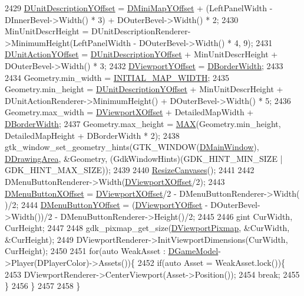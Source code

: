 \begin{DoxyCode}
2429     \hyperlink{classCApplicationData_a6c60b2da482699f1d998acfe24fec332}{DUnitDescriptionYOffset} = \hyperlink{classCApplicationData_ad33fc850bd8262a4bdf1f23e9477d5ad}{DMiniMapYOffset} + (LeftPanelWidth - 
      DInnerBevel->Width() * 3) + DOuterBevel->Width() * 2;
2430     MinUnitDescrHeight = DUnitDescriptionRenderer->MinimumHeight(LeftPanelWidth - DOuterBevel->Width() * 4,
       9);
2431     \hyperlink{classCApplicationData_a8ccfb55bd25cba0e6eb66573ba9c8b3c}{DUnitActionYOffset} = \hyperlink{classCApplicationData_a6c60b2da482699f1d998acfe24fec332}{DUnitDescriptionYOffset} + 
      MinUnitDescrHeight + DOuterBevel->Width() * 3;
2432     \hyperlink{classCApplicationData_afc58ed96a1af813b28f6abf2c7d2dc72}{DViewportYOffset} = \hyperlink{classCApplicationData_a566b69c72fa982c6ecf8e47dc21df489}{DBorderWidth};
2433     
2434     Geometry.min\_width = \hyperlink{main_8cpp_ad7891427e5564fd0ea2a08a5857e4239}{INITIAL\_MAP\_WIDTH};
2435     Geometry.min\_height = \hyperlink{classCApplicationData_a6c60b2da482699f1d998acfe24fec332}{DUnitDescriptionYOffset} + MinUnitDescrHeight + 
      DUnitActionRenderer->MinimumHeight() + DOuterBevel->Width() * 5;
2436     Geometry.max\_width = \hyperlink{classCApplicationData_a306bba873ccc47126111305fe21ef3ff}{DViewportXOffset} + DetailedMapWidth + 
      \hyperlink{classCApplicationData_a566b69c72fa982c6ecf8e47dc21df489}{DBorderWidth};
2437     Geometry.max\_height = \hyperlink{main_8cpp_afa99ec4acc4ecb2dc3c2d05da15d0e3f}{MAX}(Geometry.min\_height, DetailedMapHeight + DBorderWidth * 2);
2438     gtk\_window\_set\_geometry\_hints(GTK\_WINDOW(\hyperlink{classCApplicationData_af3c57a84b4ecca8a7f86b67a0ae55372}{DMainWindow}), 
      \hyperlink{classCApplicationData_a4735f5d31632313e0b2a1659eb178987}{DDrawingArea}, &Geometry, (GdkWindowHints)(GDK\_HINT\_MIN\_SIZE | GDK\_HINT\_MAX\_SIZE));
2439     
2440     \hyperlink{classCApplicationData_ad8b16ccb099b4996ce9fee34a407c091}{ResizeCanvases}();
2441     
2442     DMenuButtonRenderer->Width(\hyperlink{classCApplicationData_a306bba873ccc47126111305fe21ef3ff}{DViewportXOffset}/2);
2443     \hyperlink{classCApplicationData_a04283b17a8c04af8325de4304a848095}{DMenuButtonXOffset} = \hyperlink{classCApplicationData_a306bba873ccc47126111305fe21ef3ff}{DViewportXOffset}/2 - DMenuButtonRenderer->Width(
      )/2;
2444     \hyperlink{classCApplicationData_a63012360d0a98eef89707a503f4379a8}{DMenuButtonYOffset} = (\hyperlink{classCApplicationData_afc58ed96a1af813b28f6abf2c7d2dc72}{DViewportYOffset} - DOuterBevel->Width())/2 - 
      DMenuButtonRenderer->Height()/2;
2445     
2446     gint CurWidth, CurHeight;
2447         
2448     gdk\_pixmap\_get\_size(\hyperlink{classCApplicationData_ac8801e116d0c49776c9f3db7415287fe}{DViewportPixmap}, &CurWidth, &CurHeight); 
2449     DViewportRenderer->InitViewportDimensions(CurWidth, CurHeight); 
2450     
2451     \textcolor{keywordflow}{for}(\textcolor{keyword}{auto} WeakAsset : \hyperlink{classCApplicationData_a32b50c7c1cbac3cfd67c7f775b1d6fee}{DGameModel}->Player(DPlayerColor)->Assets())\{
2452         \textcolor{keywordflow}{if}(\textcolor{keyword}{auto} Asset = WeakAsset.lock())\{
2453             DViewportRenderer->CenterViewport(Asset->Position());
2454             \textcolor{keywordflow}{break};
2455         \}
2456     \}
2457     
2458 \}
\end{DoxyCode}
